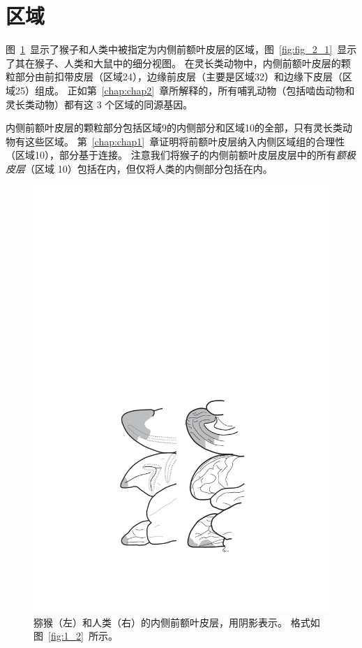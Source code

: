 \section{区域}

图~\ref{fig:3_1}~显示了猴子和人类中被指定为内侧前额叶皮层的区域，图~\ref{fig:fig_2_1}~显示了其在猴子、人类和大鼠中的细分视图。
在灵长类动物中，内侧前额叶皮层的颗粒部分由前扣带皮层（区域24），边缘前皮层（主要是区域32）和边缘下皮层（区域25）组成。
正如第~\ref{chap:chap2}~章所解释的，所有哺乳动物（包括啮齿动物和灵长类动物）都有这 3 个区域的同源基因。\par
内侧前额叶皮层的颗粒部分包括区域9的内侧部分和区域10的全部，只有灵长类动物有这些区域。
第~\ref{chap:chap1}~章证明将前额叶皮层纳入内侧区域组的合理性（区域10），部分基于连接。
注意我们将猴子的内侧前额叶皮层皮层中的所有\textit{额极皮层}（区域 10）包括在内，但仅将人类的内侧部分包括在内。

\begin{figure}[!htb]
	\centering
	\includegraphics{chap3/3_1}
	\caption{猕猴（左）和人类（右）的内侧前额叶皮层，用阴影表示。
		格式如图~\ref{fig:1_2}~所示。}
	\label{fig:3_1}
\end{figure}


